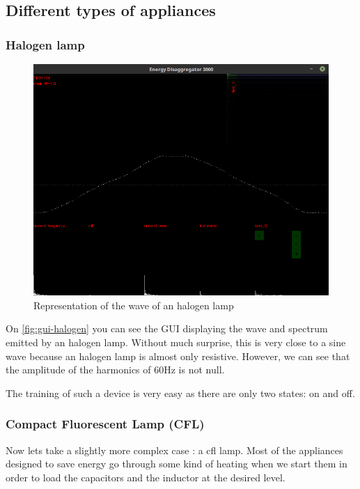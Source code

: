 \subsection{Different types of appliances}\label{section:appliances}
\subsubsection{Halogen lamp}
\begin{figure}
    \centering
    \includegraphics[trim={0 7cm 0 7cm},clip,width=\textwidth,decodearray={1 0 1 0 1 0}]{img/gui-halogen.png}
    \caption{Representation of the wave of an halogen lamp}
    \label{fig:gui-halogen}
\end{figure}
On \autoref{fig:gui-halogen} you can see the GUI displaying the wave and spectrum emitted by an halogen lamp. Without much surprise, this is very close to a sine wave because an halogen lamp is almost only resistive. However, we can see that the amplitude of the harmonics of 60Hz is not null.

The training of such a device is very easy as there are only two states: on and off.

\subsubsection{Compact Fluorescent Lamp (CFL)}
Now lets take a slightly more complex case : a \acrshort{cfl} lamp. Most of the appliances designed to save energy go through some kind of heating when we start them in order to load the capacitors and the inductor at the desired level.

